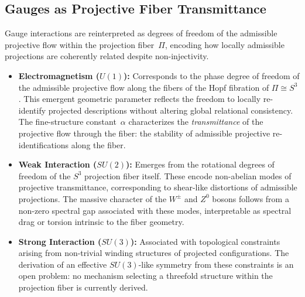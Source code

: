 \subsection{Gauges as Projective Fiber Transmittance}
  \label{sec:gauges-transmittance}

  Gauge interactions are reinterpreted as degrees of freedom of the
  admissible projective flow within the projection fiber~$\Pi$, encoding
  how locally admissible projections are coherently related despite
  non-injectivity.

  \begin{itemize}
    \item \textbf{Electromagnetism ($U(1)$):}
    Corresponds to the phase degree of freedom of the admissible projective
    flow along the fibers of the Hopf fibration of
    $\Pi \cong S^3$.
    This emergent geometric parameter reflects the freedom to locally
    re-identify projected descriptions without altering global relational
    consistency.
    The fine-structure constant~$\alpha$ characterizes the
    \emph{transmittance} of the projective flow through the fiber:
    the stability of admissible projective re-identifications along the
    fiber.

    \item \textbf{Weak Interaction ($SU(2)$):}
    Emerges from the rotational degrees of freedom of the $S^3$
    projection fiber itself.
    These encode non-abelian modes of projective transmittance,
    corresponding to shear-like distortions of admissible projections.
    The massive character of the $W^\pm$ and $Z^0$ bosons follows from a
    non-zero spectral gap associated with these modes, interpretable as
    spectral drag or torsion intrinsic to the fiber geometry.

    \item \textbf{Strong Interaction ($SU(3)$):}
    Associated with topological constraints arising from non-trivial
    winding structures of projected configurations.
    The derivation of an effective $SU(3)$-like symmetry from these
    constraints is an open problem: no mechanism selecting a threefold
    structure within the projection fiber is currently derived.
  \end{itemize}
